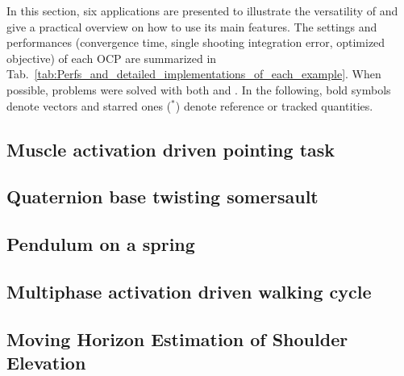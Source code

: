 In this section, six applications are presented to illustrate the versatility of \bioptim and give a practical overview on how to use its main features.
The settings and performances (convergence time, single shooting integration error, optimized objective) of each OCP are summarized in Tab.~\ref{tab:Perfs_and_detailed_implementations_of_each_example}. 
When possible, problems were solved with both \ipopt and \acados.
In the following, bold symbols denote vectors and starred ones ($^*$) denote reference or tracked quantities.


\subsection{Muscle activation driven pointing task}\label{ex:poiting}


\subsection{Quaternion base twisting somersault}\label{ex:somersault}


\subsection{Pendulum on a spring}\label{ex:spring}


\subsection{Multiphase activation driven walking cycle}\label{ex:walking}


\subsection{Moving Horizon Estimation of Shoulder Elevation}\label{ex:mhe}


